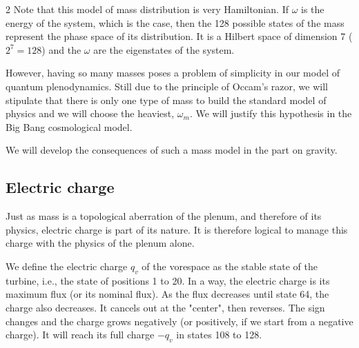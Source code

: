 \begin{multicols}{2}
	Note that this model of mass distribution is very Hamiltonian. 
	If $\omega$ is the energy of the system, which is the case, then the 128 
	possible states of the mass represent the phase space of its distribution. 
	It is a Hilbert space of dimension 7 ($2^7=128$) and the $\omega$ are the 
	eigenstates of the system.
	
	However, having so many masses poses a problem of simplicity 
	in our model of quantum plenodynamics. Still due to the 
	principle of Occam's razor, we will stipulate that there is only one type of mass 
	to build the standard model of physics and we will choose the 
	heaviest, $\omega_m$. We will justify this hypothesis in the Big Bang 
	cosmological model.
	
	We will develop the consequences of such a mass model in the 
	part on gravity.
	
	\subsection{Electric charge}
	
	Just as mass is a topological aberration of the plenum, and therefore of its
	physics, electric charge is part of its nature. It is therefore logical 
	to manage this charge with the physics of the plenum alone.
	
	We define the electric charge $q_v$ of the vorespace as the stable state 
	of the turbine, i.e., the state of positions 1 to 20. In a way, the electric 
	charge is its maximum flux (or its nominal flux). As the flux decreases 
	until state 64, the charge also decreases. It cancels out at the 
	"center", then reverses. The sign changes and the charge grows 
	negatively (or positively, if we start from a negative charge). 
	It will reach its full charge $-q_v$ in states 108 to 128.
	

\end{multicols}
